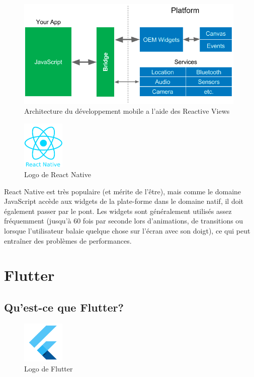 \begin{figure}[h]
	\begin{center}
		\includegraphics[width=11cm]{Images/chapter2/reactive_views.png}
		\caption{{\footnotesize Architecture du développement mobile a l'aide des Reactive Views\cite{leler_whats_2017}}}
	\end{center}
\end{figure}

\begin{figure}
	\includegraphics[width=2cm]{Images/chapter2/react_native_logo.png}
	\vspace{-20pt}
	\caption{{\footnotesize Logo de React Native}}
\end{figure}

React Native est très populaire (et mérite de l'être), mais comme le domaine JavaScript accède aux widgets de la plate-forme dans le domaine natif, il doit également passer par le pont. Les widgets sont généralement utilisés assez fréquemment (jusqu'à 60 fois par seconde lors d'animations, de transitions ou lorsque l'utilisateur balaie quelque chose sur l'écran avec son doigt), ce qui peut entraîner des problèmes de performances.

\section{Flutter}

\subsection{Qu'est-ce que Flutter?}

\begin{figure}
	\includegraphics[width=2cm]{Images/chapter2/flutter_logo.png}
	\vspace{-20pt}
	\caption{{\footnotesize Logo de Flutter}}
\end{figure}


